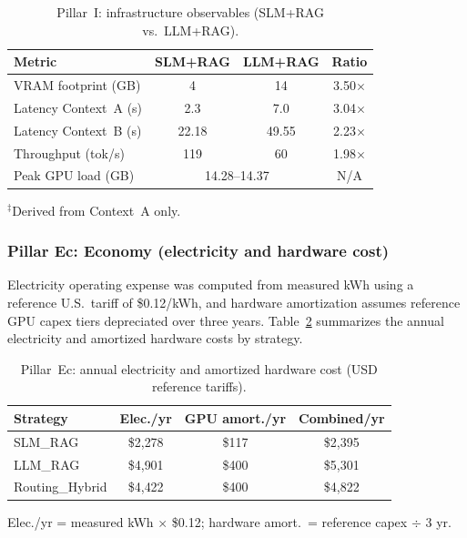 \begin{table}[htbp]
\centering
\caption{Pillar~I: infrastructure observables (SLM+RAG vs.\ LLM+RAG).}
\label{tab:eie-infrastructure}
\footnotesize
\setlength{\tabcolsep}{4pt}
\renewcommand{\arraystretch}{1.1}
\begin{tabular}{l|c|c|c}
\toprule
\textbf{Metric} & \textbf{SLM+RAG} & \textbf{LLM+RAG} & \textbf{Ratio} \\
\midrule
VRAM footprint (GB) & 4 & 14 & 3.50$\times$ \\
Latency Context~A (s) & 2.3 & 7.0 & 3.04$\times$ \\
Latency Context~B (s) & 22.18 & 49.55 & 2.23$\times$ \\
Throughput (tok/s) & 119 & 60 & 1.98$\times$ \\
Peak GPU load (GB) & \multicolumn{2}{c|}{14.28--14.37} & N/A \\
\bottomrule
\end{tabular}

\vspace{2pt}
\noindent\footnotesize $^{\ddagger}$Derived from Context~A only.
\end{table}

\subsubsection{Pillar Ec: Economy (electricity and hardware cost)}

Electricity operating expense was computed from measured kWh using a reference U.S.\ tariff of \$0.12/kWh, and hardware amortization assumes reference GPU capex tiers depreciated over three years. Table~\ref{tab:eie-economy} summarizes the annual electricity and amortized hardware costs by strategy.

\begin{table}[htbp]
\centering
\caption{Pillar~Ec: annual electricity and amortized hardware cost (USD reference tariffs).}
\label{tab:eie-economy}
\footnotesize
\setlength{\tabcolsep}{3pt}
\renewcommand{\arraystretch}{1.1}
\begin{tabular}{l|c|c|c}
\toprule
\textbf{Strategy} & \textbf{Elec./yr} & \textbf{GPU amort./yr} & \textbf{Combined/yr} \\
\midrule
SLM\_RAG & \$2{,}278 & \$117 & \$2{,}395 \\
LLM\_RAG & \$4{,}901 & \$400 & \$5{,}301 \\
Routing\_Hybrid & \$4{,}422 & \$400 & \$4{,}822 \\
\bottomrule
\end{tabular}

\vspace{2pt}
\noindent\footnotesize Elec./yr = measured kWh $\times$ \$0.12; hardware amort.\ = reference capex $\div$ 3 yr.
\end{table}